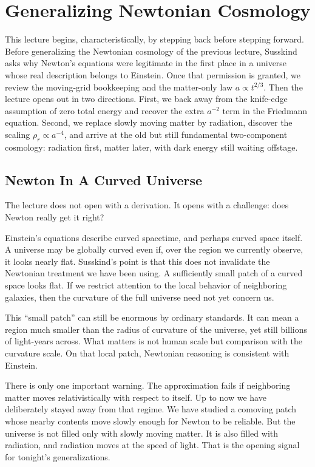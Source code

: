 \chapter{Generalizing Newtonian Cosmology}

This lecture begins, characteristically, by stepping back before stepping forward. Before generalizing the Newtonian cosmology of the previous lecture, Susskind asks why Newton's equations were legitimate in the first place in a universe whose real description belongs to Einstein. Once that permission is granted, we review the moving-grid bookkeeping and the matter-only law \(a\propto t^{2/3}\). Then the lecture opens out in two directions. First, we back away from the knife-edge assumption of zero total energy and recover the extra \(a^{-2}\) term in the Friedmann equation. Second, we replace slowly moving matter by radiation, discover the scaling \(\rho_r\propto a^{-4}\), and arrive at the old but still fundamental two-component cosmology: radiation first, matter later, with dark energy still waiting offstage.

\section{Newton In A Curved Universe}

The lecture does not open with a derivation. It opens with a challenge: does Newton really get it right?

Einstein's equations describe curved spacetime, and perhaps curved space itself. A universe may be globally curved even if, over the region we currently observe, it looks nearly flat. Susskind's point is that this does not invalidate the Newtonian treatment we have been using. A sufficiently small patch of a curved space looks flat. If we restrict attention to the local behavior of neighboring galaxies, then the curvature of the full universe need not yet concern us.

This ``small patch'' can still be enormous by ordinary standards. It can mean a region much smaller than the radius of curvature of the universe, yet still billions of light-years across. What matters is not human scale but comparison with the curvature scale. On that local patch, Newtonian reasoning is consistent with Einstein.

There is only one important warning. The approximation fails if neighboring matter moves relativistically with respect to itself. Up to now we have deliberately stayed away from that regime. We have studied a comoving patch whose nearby contents move slowly enough for Newton to be reliable. But the universe is not filled only with slowly moving matter. It is also filled with radiation, and radiation moves at the speed of light. That is the opening signal for tonight's generalizations.

